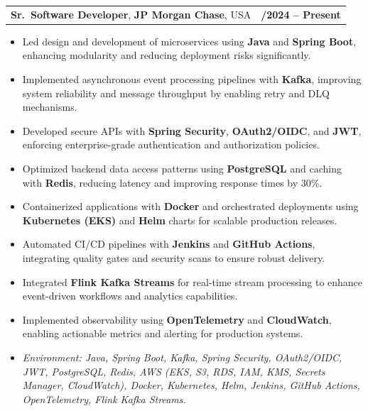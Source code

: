 \documentclass[letterpaper,11pt]{article}
\makeatletter
\newcommand{\resumeItem}[1]{
  \item\footnotesize{
    {#1 \vspace{-2pt}}
  }
}
\newcommand{\resumeSubheading}[4]{
  \vspace{-2pt}\item
    \begin{tabular*}{1.0\textwidth}[t]{l@{\extracolsep{\fill}}r}
      \textbf{\fontsize{10pt}{14pt}\selectfont #3}, \textbf{\fontsize{10pt}{14pt}\selectfont #1}, \fontsize{10pt}{14pt}\selectfont #4 & \textbf{\fontsize{10pt}{14pt}\selectfont #2} \\
    \end{tabular*}\vspace{-7pt}
}
\newcommand{\resumeItemListStart}{\begin{itemize}[leftmargin=*]}
\newcommand{\resumeItemListEnd}{\end{itemize}\vspace{-5pt}}
\makeatother
\begin{document}
\resumeSubheading
{JP Morgan Chase}{09/2024 -- Present}
{Sr.\ Software Developer}{USA}
\resumeItemListStart
  \resumeItem{Led design and development of microservices using \textbf{Java} and \textbf{Spring Boot}, enhancing modularity and reducing deployment risks significantly.}
  \resumeItem{Implemented asynchronous event processing pipelines with \textbf{Kafka}, improving system reliability and message throughput by enabling retry and DLQ mechanisms.}
  \resumeItem{Developed secure APIs with \textbf{Spring Security}, \textbf{OAuth2/OIDC}, and \textbf{JWT}, enforcing enterprise-grade authentication and authorization policies.}
  \resumeItem{Optimized backend data access patterns using \textbf{PostgreSQL} and caching with \textbf{Redis}, reducing latency and improving response times by 30\%.}
  \resumeItem{Containerized applications with \textbf{Docker} and orchestrated deployments using \textbf{Kubernetes (EKS)} and \textbf{Helm} charts for scalable production releases.}
  \resumeItem{Automated CI/CD pipelines with \textbf{Jenkins} and \textbf{GitHub Actions}, integrating quality gates and security scans to ensure robust delivery.}
  \resumeItem{Integrated \textbf{Flink Kafka Streams} for real-time stream processing to enhance event-driven workflows and analytics capabilities.}
  \resumeItem{Implemented observability using \textbf{OpenTelemetry} and \textbf{CloudWatch}, enabling actionable metrics and alerting for production systems.}
  \resumeItem{\textit{Environment: Java, Spring Boot, Kafka, Spring Security, OAuth2/OIDC, JWT, PostgreSQL, Redis, AWS (EKS, S3, RDS, IAM, KMS, Secrets Manager, CloudWatch), Docker, Kubernetes, Helm, Jenkins, GitHub Actions, OpenTelemetry, Flink Kafka Streams.}}
\resumeItemListEnd
\end{document}
